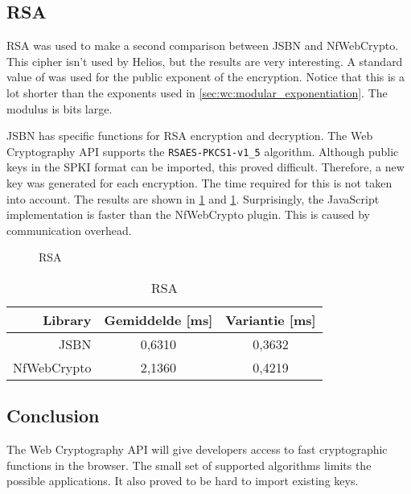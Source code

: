 \subsection{RSA}

RSA was used to make a second comparison between JSBN and NfWebCrypto. This cipher isn't used by Helios, but the results are very interesting. A standard value of  was used for the public exponent of the encryption. Notice that this is a lot shorter than the exponents used in \ref{sec:wc:modular_exponentiation}. The modulus is  bits large.

\par JSBN has specific functions for RSA encryption and decryption. The Web Cryptography API supports the \texttt{RSAES-PKCS1-v1\_5} algorithm.\cite{rfc3447} Although public keys in the SPKI format can be imported, this proved difficult. Therefore, a new key was generated for each encryption. The time required for this is not taken into account. The results are shown in \ref{fig:wc:rsa} and \ref{tab:wc:rsa}. Surprisingly, the JavaScript implementation is faster than the NfWebCrypto plugin. This is caused by communication overhead.

\begin{figure}
  \caption{RSA}
  \label{fig:wc:rsa}
\end{figure}

\begin{table}
  \begin{center}
    \begin{tabular}{r | c c}
      Library & Gemiddelde [ms] & Variantie [ms] \\ \hline
      JSBN & 0,6310 & 0,3632  \\
      NfWebCrypto & 2,1360 & 0,4219
    \end{tabular}
    \caption{RSA}
    \label{tab:wc:rsa}
  \end{center}
\end{table}

\subsection{Conclusion}

The Web Cryptography API will give developers access to fast cryptographic functions in the browser. The small set of supported algorithms limits the possible applications. It also proved to be hard to import existing keys.
